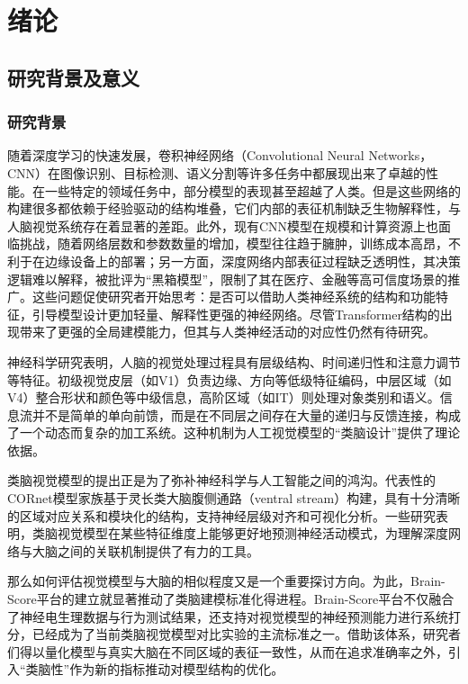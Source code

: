 
\chapter{绪论}

\section{研究背景及意义}

\subsection{研究背景}

随着深度学习的快速发展，卷积神经网络（Convolutional Neural Networks，CNN）在图像识别、目标检测、语义分割等许多任务中都展现出来了卓越的性能。在一些特定的领域任务中，部分模型的表现甚至超越了人类。但是这些网络的构建很多都依赖于经验驱动的结构堆叠，它们内部的表征机制缺乏生物解释性，与人脑视觉系统存在着显著的差距。此外，现有CNN模型在规模和计算资源上也面临挑战，随着网络层数和参数数量的增加，模型往往趋于臃肿，训练成本高昂，不利于在边缘设备上的部署；另一方面，深度网络内部表征过程缺乏透明性，其决策逻辑难以解释，被批评为“黑箱模型”，限制了其在医疗、金融等高可信度场景的推广\cite{bau2017network}。这些问题促使研究者开始思考：是否可以借助人类神经系统的结构和功能特征，引导模型设计更加轻量、解释性更强的神经网络。尽管Transformer结构的出现带来了更强的全局建模能力，但其与人类神经活动的对应性仍然有待研究\cite{ramachandram2017deep}。

神经科学研究表明，人脑的视觉处理过程具有层级结构、时间递归性和注意力调节等特征。初级视觉皮层（如V1）负责边缘、方向等低级特征编码，中层区域（如V4）整合形状和颜色等中级信息，高阶区域（如IT）则处理对象类别和语义。信息流并不是简单的单向前馈，而是在不同层之间存在大量的递归与反馈连接，构成了一个动态而复杂的加工系统。这种机制为人工视觉模型的“类脑设计”提供了理论依据\cite{dicarlo2012does}。

类脑视觉模型的提出正是为了弥补神经科学与人工智能之间的鸿沟。代表性的CORnet模型家族基于灵长类大脑腹侧通路（ventral stream）构建，具有十分清晰的区域对应关系和模块化的结构，支持神经层级对齐和可视化分析。一些研究表明，类脑视觉模型在某些特征维度上能够更好地预测神经活动模式，为理解深度网络与大脑之间的关联机制提供了有力的工具\cite{ kubilius2019brain}。

那么如何评估视觉模型与大脑的相似程度又是一个重要探讨方向。为此，Brain-Score平台的建立就显著推动了类脑建模标准化得进程\cite{schrimpf2018brain}。Brain-Score平台不仅融合了神经电生理数据与行为测试结果，还支持对视觉模型的神经预测能力进行系统打分，已经成为了当前类脑视觉模型对比实验的主流标准之一。借助该体系，研究者们得以量化模型与真实大脑在不同区域的表征一致性，从而在追求准确率之外，引入“类脑性”作为新的指标推动对模型结构的优化。

